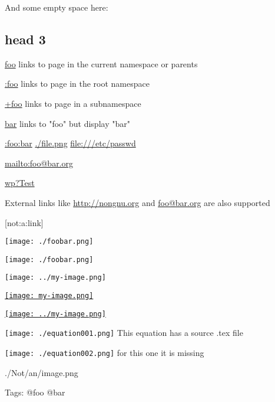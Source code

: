 And some empty space here:







\subsection{head 3}

\href{foo}{foo}  links to page in the current namespace or parents

\href{:foo}{:foo} links to page in the root namespace

\href{+foo}{+foo} links to page in a subnamespace

\href{foo}{bar} links to "foo" but display "bar"



\href{:foo:bar}{:foo:bar} \href{./file.png}{./file.png} \href{file:///etc/passwd}{file:///etc/passwd}



\href{mailto:foo@bar.org}{mailto:foo@bar.org}

\href{interwiki:wp?Test}{wp?Test}



External links like \href{http://nongnu.org}{http://nongnu.org} and \href{mailto:foo@bar.org}{foo@bar.org} are also supported



[not:a:link]





\texttt{[image: ./foobar.png]}

\texttt{[image: ./foobar.png]}

\texttt{[image: ../my-image.png]}

\href{Foo}{\texttt{[image: my-image.png]}}

\href{:foo:bar}{\texttt{[image: ../my-image.png]}}



\texttt{[image: ./equation001.png]} This equation has a source .tex file

\texttt{[image: ./equation002.png]} for this one it is missing



{./Not/an/image.png}



Tags: @foo @bar



